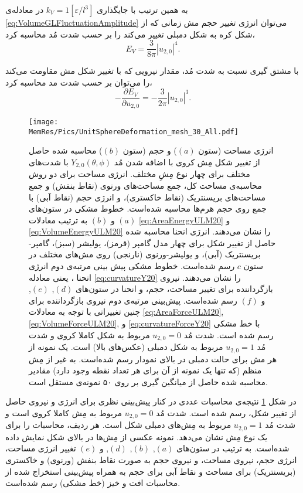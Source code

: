 به همین ترتیب با جایگذاری 
$k_V=1[\varepsilon/l^3]$
در معادله‌ی
\ref{eq:VolumeGLFluctuationAmplitude}
می‌توان انرژی تغییر حجم مش زمانی که از  شکل کره به شکل دمبلی تغییر می‌کند را بر حسب شدت مُد محاسبه کرد،
\begin{equation}
E_V= \frac{3}{8\pi}|u_{2,0}|^4.
\label{eq:VolumeEnergyULM20}
\end{equation}

با مشتق ‌گیری نسبت به شدت مُد، مقدار نیرویی که با تغییر شکل مش مقاومت می‌کند را می‌توان بر حسب شدت مد محاسبه کرد،
\begin{equation}
-\frac{\partial E_V}{\partial u_{2,0}}= -\frac{3}{2\pi}|u_{2,0}|^3.
\label{eq:VolumeForceULM20}
\end{equation}

\begin{figure}[tbp]
\begin{center}
\texttt{[image: \\MemRes/Pics/UnitSphereDeformation\_mesh\_30\_All.pdf]}
\caption{
انرژی مساحت (ستون 
$(a)$)
 و حجم (ستون 
$(b)$)
 محاسبه‌ شده حاصل از تغییر شکل مِش کروی با اضافه شدن مُد
$Y_{2,0}(\theta,\phi)$
با شدت‌های مختلف برای چهار نوع مِشِ مختلف. انرژی مساحت برای دو روش محاسبه‌ی مساحت کل، جمع مساحت‌های ورنوی (نقاط بنفش) و جمع مساحت‌های بریسنتریک (نقاط خاکستری)، و انرژی حجم (نقاط آبی) با جمع روی حجم هرم‌ها محاسبه شده‌است. خطوط مشکی در ستون‌های 
$(a)$
و
$(b)$
به ترتیب معادلات
\ref{eq:AreaEnergyULM20}
و
\ref{eq:VolumeEnergyULM20}
را نشان می‌دهند. انرژی انحنا محاسبه‌ شده حاصل از تغییر شکل برای چهار مدل گامپر (قرمز)، یولیشر (سبز)، گامپر-بریسنتریک (آبی)، و یولیشر-ورنوی (نارنجی) روی مش‌های مختلف در ستون
$c$
 رسم شده‌است. خطوط مشکی پیش بینی
 مرتبه‌ی دوم انرژی انحنا ، یعنی معادله
\ref{eq:curvatureY20}
را نشان می‌دهند. نیروی بازگرداننده برای تغییر مساحت، حجم، و انحنا در ستون‌های 
$(d)$, $(e)$,
و
$(f)$
رسم شده‌است.  پیش‌بینی‌ مرتبه‌ی دوم نیروی بازگرداننده برای چنین تغییراتی با توجه به معادلات
\ref{eq:AreaForceULM20}, \ref{eq:VolumeForceULM20}, 
و
\ref{eq:curvatureForceY20}
با خط مشکی رسم شده است. شدت مُد 
$u_{2,0}=0$
مربوط به شکل کاملا کروی و شدت مُد 
$u_{2,0}=1$
مربوط به شکل دمبلی (عکس‌های بالا) است. یک نمونه از هر مش برای حالت دمبلی در بالای نمودار رسم شده‌است. به غیر از مِش منظم (که تنها یک نمونه از آن برای هر تعداد نقطه وجود دارد) مقادیر محاسبه شده حاصل از میانگین گیری بر روی ۵۰ نمونه‌ی مستقل ‌است.
}
\label{fig:AllULM20}
\end{center}
\end{figure}


در شکل
\ref{fig:AllULM20}
نتیجه‌ی محاسبات عددی در کنار پیش‌بینی نظری برای انرژی و نیروی حاصل از تغییر شکل، رسم شده است. شدت مُد
$u_{2,0}=0$
مربوط به مِش کاملا کروی است و شدت مُد 
$u_{2,0}=1$
مربوط به مِش‌های دمبلی شکل است. هر ردیف، محاسبات را برای یک نوع مِش نشان می‌دهد. نمونه‌ عکسی از مِش‌ها در بالای شکل نمایش داده‌ شده‌است. به ترتیب در ستون‌های 
$(a)$, $(b)$, $(d)$, 
 و
$(e)$
تغییر انرژی مساحت، انرژی حجم، نیروی مساحت، و نیروی حجم به صورت نقاط بنفش (ورنوی) و خاکستری (بریسنتریک) برای مساحت و نقاط آبی برای حجم به همراه پیش‌بینی استخراج شده از محاسبات افت و خیز (خط مشکی) رسم شده‌است. 

